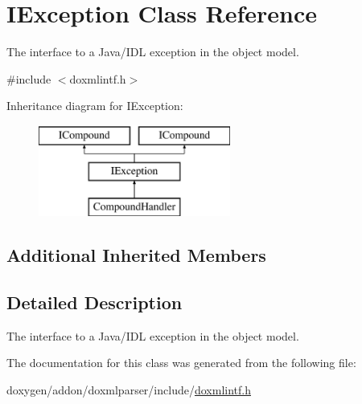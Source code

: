 \hypertarget{class_i_exception}{}\section{I\+Exception Class Reference}
\label{class_i_exception}


The interface to a Java/\+I\+DL exception in the object model.  




{\ttfamily \#include $<$doxmlintf.\+h$>$}

Inheritance diagram for I\+Exception\+:\begin{figure}[H]
\begin{center}
\leavevmode
\includegraphics[height=3.000000cm]{class_i_exception}
\end{center}
\end{figure}
\subsection*{Additional Inherited Members}


\subsection{Detailed Description}
The interface to a Java/\+I\+DL exception in the object model. 

The documentation for this class was generated from the following file\+:\begin{DoxyCompactItemize}
\item 
doxygen/addon/doxmlparser/include/\mbox{\hyperlink{include_2doxmlintf_8h}{doxmlintf.\+h}}\end{DoxyCompactItemize}

